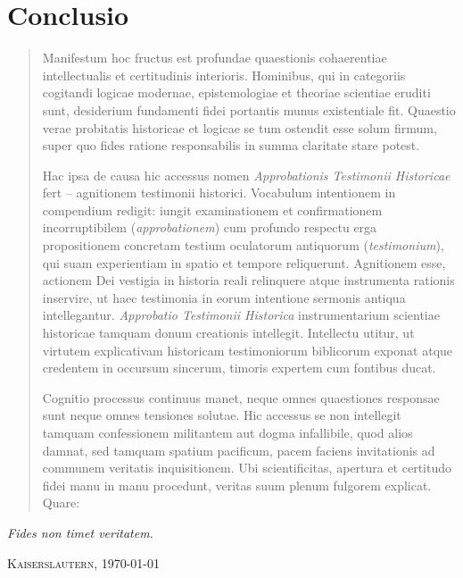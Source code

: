 \documentclass[11pt,a4paper]{article}
\begin{document}
\begin{minipage}{\textwidth}
\section*{Conclusio}
\begin{quote}
Manifestum hoc fructus est profundae quaestionis cohaerentiae intellectualis et certitudinis interioris. Hominibus, qui in categoriis cogitandi logicae modernae, epistemologiae et theoriae scientiae eruditi sunt, desiderium fundamenti fidei portantis munus existentiale fit. Quaestio verae probitatis historicae et logicae se tum ostendit esse solum firmum, super quo fides ratione responsabilis in summa claritate stare potest.

Hac ipsa de causa hic accessus nomen \textit{Approbationis Testimonii Historicae} fert -- agnitionem testimonii historici. Vocabulum intentionem in compendium redigit: iungit examinationem et confirmationem incorruptibilem (\textit{approbationem}) cum profundo respectu erga propositionem concretam testium oculatorum antiquorum (\textit{testimonium}), qui suam experientiam in spatio et tempore reliquerunt. Agnitionem esse, actionem Dei vestigia in historia reali relinquere atque instrumenta rationis inservire, ut haec testimonia in eorum intentione sermonis antiqua intellegantur. \textit{Approbatio Testimonii Historica} instrumentarium scientiae historicae tamquam donum creationis intellegit. Intellectu utitur, ut virtutem explicativam historicam testimoniorum biblicorum exponat atque credentem in occursum sincerum, timoris expertem cum fontibus ducat.

Cognitio processus continuus manet, neque omnes quaestiones responsae sunt neque omnes tensiones solutae. Hic accessus se non intellegit tamquam confessionem militantem aut dogma infallibile, quod alios damnat, sed tamquam spatium pacificum, pacem faciens invitationis ad communem veritatis inquisitionem. Ubi scientificitas, apertura et certitudo fidei manu in manu procedunt, veritas suum plenum fulgorem explicat. Quare:
\end{quote}

\begin{center}
{\large\itshape Fides non timet veritatem.}
\end{center}

\vspace{0.2cm}
\begin{flushright}
{\scshape Kaiserslautern, \today}
\end{flushright}


\end{minipage}
\end{document}
